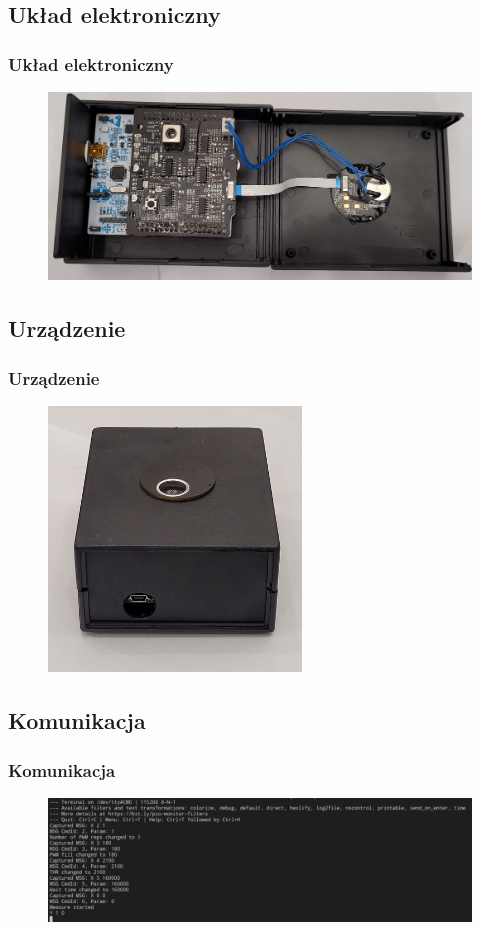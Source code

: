 \documentclass[xcolor=dvipsnames]{beamer}%
\begin{document}
\subsection{Układ elektroniczny}
\begin{frame}
	\frametitle{Układ elektroniczny}
	\begin{figure}
		\includegraphics[width=\textwidth]{figure/doneotwarte.jpg}
	\end{figure}
\end{frame}

\subsection{Urządzenie}
\begin{frame}
	\frametitle{Urządzenie}
	\begin{figure}
		\includegraphics[width=0.6\textwidth]{figure/donezamkniete.jpg}
	\end{figure}
\end{frame}

\subsection{Komunikacja}
\begin{frame}
	\frametitle{Komunikacja}
	\begin{figure}
		\includegraphics[width=\textwidth]{figure/comm.png}
	\end{figure}
\end{frame}
\end{document}
